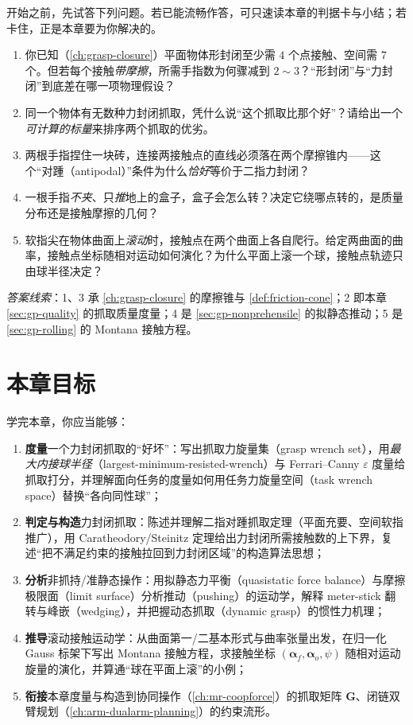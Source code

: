 \begin{practice}[前置自测]
开始之前，先试答下列问题。若已能流畅作答，可只速读本章的判据卡与小结；若卡住，正是本章要为你解决的。
\begin{enumerate}
  \item 你已知（\cref{ch:grasp-closure}）平面物体形封闭至少需 $4$ 个点接触、空间需 $7$ 个。但若每个接触\emph{带摩擦}，所需手指数为何骤减到 $2\sim3$？“形封闭”与“力封闭”到底差在哪一项物理假设？
  \item 同一个物体有无数种力封闭抓取，凭什么说“这个抓取比那个好”？请给出一个\emph{可计算的标量}来排序两个抓取的优劣。
  \item 两根手指捏住一块砖，连接两接触点的直线必须落在两个摩擦锥内——这个“对踵（antipodal）”条件为什么\emph{恰好}等价于二指力封闭？
  \item 一根手指\emph{不夹}、只\emph{推}地上的盒子，盒子会怎么转？决定它绕哪点转的，是质量分布还是接触摩擦的几何？
  \item 软指尖在物体曲面上\emph{滚动}时，接触点在两个曲面上各自爬行。给定两曲面的曲率，接触点坐标随相对运动如何演化？为什么平面上滚一个球，接触点轨迹只由球半径决定？
\end{enumerate}
\noindent\emph{答案线索}：1、3 承 \cref{ch:grasp-closure} 的摩擦锥与 \cref{def:friction-cone}；2 即本章 \cref{sec:gp-quality} 的抓取质量度量；4 是 \cref{sec:gp-nonprehensile} 的拟静态推动；5 是 \cref{sec:gp-rolling} 的 Montana 接触方程。
\end{practice}

\section*{本章目标}
学完本章，你应当能够：
\begin{enumerate}
  \item \textbf{度量}一个力封闭抓取的“好坏”：写出抓取力旋量集（grasp wrench set），用\emph{最大内接球半径}（largest-minimum-resisted-wrench）与 Ferrari--Canny $\varepsilon$ 度量给抓取打分，并理解面向任务的度量如何用任务力旋量空间（task wrench space）替换“各向同性球”；
  \item \textbf{判定与构造}力封闭抓取：陈述并理解二指对踵抓取定理（平面充要、空间软指推广），用 Caratheodory/Steinitz 定理给出力封闭所需接触数的上下界，复述“把不满足约束的接触拉回到力封闭区域”的构造算法思想；
  \item \textbf{分析}非抓持/准静态操作：用拟静态力平衡（quasistatic force balance）与摩擦极限面（limit surface）分析推动（pushing）的运动学，解释 meter-stick 翻转与峰嵌（wedging），并把握动态抓取（dynamic grasp）的惯性力机理；
  \item \textbf{推导}滚动接触运动学：从曲面第一/二基本形式与曲率张量出发，在归一化 Gauss 标架下写出 Montana 接触方程，求接触坐标 $(\boldsymbol{\alpha}_f,\boldsymbol{\alpha}_o,\psi)$ 随相对运动旋量的演化，并算通“球在平面上滚”的小例；
  \item \textbf{衔接}本章度量与构造到协同操作（\cref{ch:mr-coopforce}）的抓取矩阵 $\mathbf{G}$、闭链双臂规划（\cref{ch:arm-dualarm-planning}）的约束流形。
\end{enumerate}

